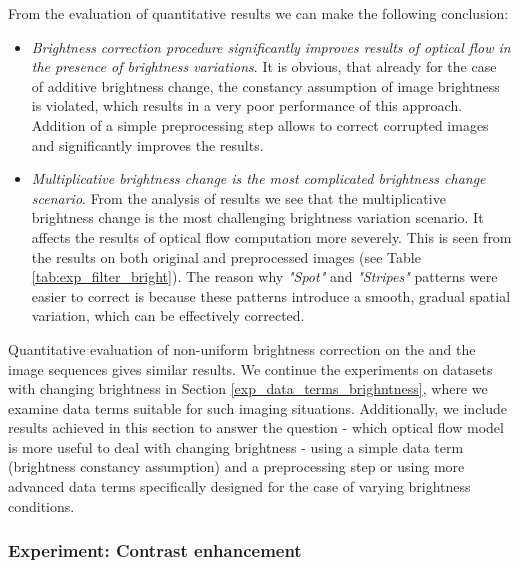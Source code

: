 From the evaluation of quantitative results we can make the following conclusion:
\begin{itemize}
\item \textit{Brightness correction procedure significantly improves results of optical flow in the presence of brightness variations}.  It is obvious,  that already for the case of additive brightness change, the constancy assumption of image brightness is violated, which results in a very poor performance of this approach. Addition of a simple preprocessing step allows to correct corrupted images and significantly improves the results.


\item \textit{Multiplicative brightness change is the most complicated brightness change scenario}. From the analysis of results we see that the multiplicative brightness change is the most challenging brightness variation scenario. It affects the results of optical flow computation more severely. This is seen from the results on both original and preprocessed images (see Table \ref{tab:exp_filter_bright}). The reason why \textit{"Spot"} and \textit{"Stripes"} patterns were easier to correct is because these patterns introduce a smooth, gradual spatial variation, which can be effectively corrected.   
\end{itemize}

Quantitative evaluation of non-uniform brightness correction on the \hyd and the \mar image sequences gives similar results. We continue the experiments on datasets with changing brightness in Section \ref{exp_data_terms_brighntness}, where we examine data terms suitable for such imaging situations. Additionally, we include results achieved in this section to answer the question - which optical flow model is more useful to deal with changing brightness - using a simple data term (brightness constancy assumption) and a preprocessing step or using more advanced data terms specifically designed for the case of varying brightness conditions.
 


\subsubsection{Experiment: Contrast enhancement}
\label{experiment_local_contrast}


